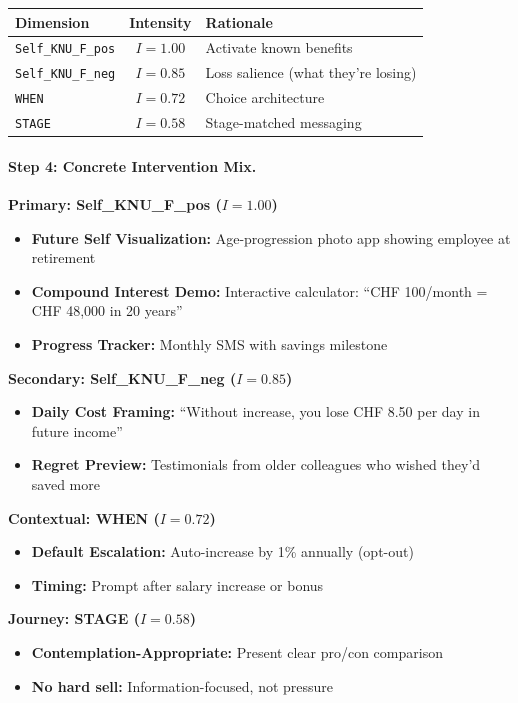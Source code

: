 \begin{center}
\begin{tabular}{@{}lcl@{}}
\toprule
\textbf{Dimension} & \textbf{Intensity} & \textbf{Rationale} \\
\midrule
\texttt{Self\_KNU\_F\_pos} & $I = 1.00$ & Activate known benefits \\
\texttt{Self\_KNU\_F\_neg} & $I = 0.85$ & Loss salience (what they're losing) \\
\texttt{WHEN} & $I = 0.72$ & Choice architecture \\
\texttt{STAGE} & $I = 0.58$ & Stage-matched messaging \\
\bottomrule
\end{tabular}
\end{center}

\paragraph{Step 4: Concrete Intervention Mix.}

\begin{tcolorbox}[colback=green!5!white, colframe=green!75!black,
    title=\textbf{Retirement Savings Intervention Package}]

\textbf{Primary: Self\_KNU\_F\_pos ($I = 1.00$)}
\begin{itemize}[nosep]
    \item \textbf{Future Self Visualization:} Age-progression photo app showing employee at retirement
    \item \textbf{Compound Interest Demo:} Interactive calculator: ``CHF 100/month = CHF 48,000 in 20 years''
    \item \textbf{Progress Tracker:} Monthly SMS with savings milestone
\end{itemize}

\textbf{Secondary: Self\_KNU\_F\_neg ($I = 0.85$)}
\begin{itemize}[nosep]
    \item \textbf{Daily Cost Framing:} ``Without increase, you lose CHF 8.50 per day in future income''
    \item \textbf{Regret Preview:} Testimonials from older colleagues who wished they'd saved more
\end{itemize}

\textbf{Contextual: WHEN ($I = 0.72$)}
\begin{itemize}[nosep]
    \item \textbf{Default Escalation:} Auto-increase by 1\% annually (opt-out)
    \item \textbf{Timing:} Prompt after salary increase or bonus
\end{itemize}

\textbf{Journey: STAGE ($I = 0.58$)}
\begin{itemize}[nosep]
    \item \textbf{Contemplation-Appropriate:} Present clear pro/con comparison
    \item \textbf{No hard sell:} Information-focused, not pressure
\end{itemize}

\end{tcolorbox}

